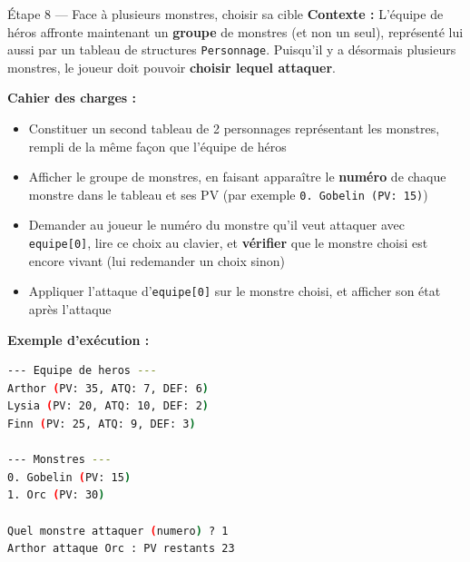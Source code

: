 \begin{UPSTIManipulation}{Étape 8 — Face à plusieurs monstres, choisir sa cible}
  \textbf{Contexte :} L'équipe de héros affronte maintenant un \textbf{groupe} de monstres (et
  non un seul), représenté lui aussi par un tableau de structures \texttt{Personnage}. Puisqu'il
  y a désormais plusieurs monstres, le joueur doit pouvoir \textbf{choisir lequel attaquer}.

  \textbf{Cahier des charges :}
  \begin{itemize}
    \item Constituer un second tableau de 2 personnages représentant les monstres, rempli de la
      même façon que l'équipe de héros
    \item Afficher le groupe de monstres, en faisant apparaître le \textbf{numéro} de chaque
      monstre dans le tableau et ses PV (par exemple \texttt{0. Gobelin (PV: 15)})
    \item Demander au joueur le numéro du monstre qu'il veut attaquer avec \texttt{equipe[0]},
      lire ce choix au clavier, et \textbf{vérifier} que le monstre choisi est encore vivant
      (lui redemander un choix sinon)
    \item Appliquer l'attaque d'\texttt{equipe[0]} sur le monstre choisi, et afficher son état
      après l'attaque
  \end{itemize}

  \textbf{Exemple d'exécution :}
  \begin{lstlisting}[language=bash]
--- Equipe de heros ---
Arthor (PV: 35, ATQ: 7, DEF: 6)
Lysia (PV: 20, ATQ: 10, DEF: 2)
Finn (PV: 25, ATQ: 9, DEF: 3)

--- Monstres ---
0. Gobelin (PV: 15)
1. Orc (PV: 30)

Quel monstre attaquer (numero) ? 1
Arthor attaque Orc : PV restants 23
  \end{lstlisting}

\end{UPSTIManipulation}
